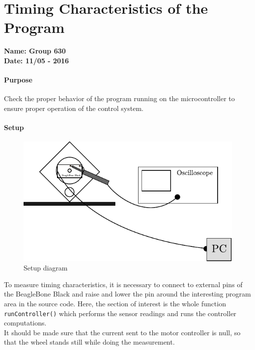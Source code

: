 \chapter{Timing Characteristics of the Program}\label{ConnectingBreakoutBoard} 
\textbf{Name: Group 630}\\
\textbf{Date: 11/05 - 2016}

\subsubsection{Purpose}
Check the proper behavior of the program running on the microcontroller to ensure proper operation of the control system.

\subsubsection{Setup}
\begin{figure}[H]
  \centering
  \includegraphics[scale=1]{figures/programTimingSetup}
  \caption{Setup diagram}
  \label{LabSetupRangeTest}
\end{figure}
To measure timing characteristics, it is necessary to connect to external pins of the BeagleBone Black and raise and lower the pin around the interesting program area in the source code. Here, the section of interest is the whole function \lstinline{runController()} which performs the sensor readings and runs the controller computations.\\
It should be made sure that the current sent to the motor controller is null, so that the wheel stands still while doing the measurement.

